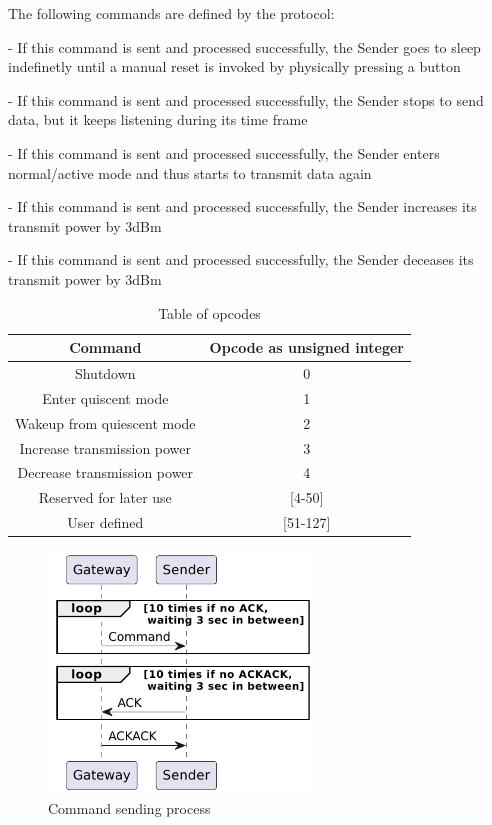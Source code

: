 The following commands are defined by the protocol:
\begin{description}[font=$\bullet$~\normalfont\scshape\color{blue!50!black}]
    \item [Shutdown] - If this command is sent and processed successfully, the Sender goes to sleep indefinetly until a manual reset is invoked by physically pressing a button
    \item [Enter quiescent mode] - If this command is sent and processed successfully, the Sender stops to send data, but it keeps
        listening during its time frame
    \item [Wakeup from quiescent mode] - If this command is sent and processed successfully, the Sender enters normal/active mode
        and thus starts to transmit data again
    \item [Increase transmission power] - If this command is sent and processed successfully, the Sender increases its
        transmit power by 3dBm
    \item [Decrease transmission power] - If this command is sent and processed successfully, the Sender deceases its
        transmit power by 3dBm
\end{description}

\begin{table}[ht]
    \centering
    \begin{tabular}{ |c|c| }
        \hline
        \textbf{Command} & \textbf{Opcode as unsigned integer}\\
        \hline
        Shutdown & 0\\
        \hline
        Enter quiscent mode & 1\\
        \hline
        Wakeup from quiescent mode & 2\\
        \hline
        Increase transmission power & 3\\
        \hline
        Decrease transmission power & 4\\
        \hline
        Reserved for later use & [4-50]\\
        \hline
        User defined & [51-127]\\
        \hline
    \end{tabular}
    \caption{Table of opcodes}
    \label{tab: opcodes}
\end{table}

\begin{figure}[ht]
    \centering
    \includegraphics[width=200pt]{uml/command_ack.pdf}
    \caption{Command sending process}
    \label{img: command ack}
\end{figure}

